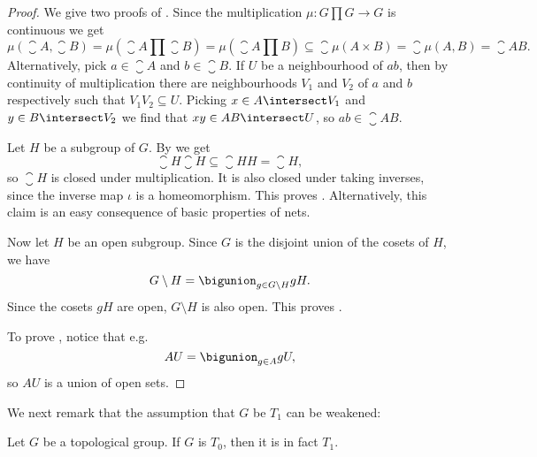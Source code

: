 \documentclass[article, a4paper, 11pt, oneside]{memoir}
\numberwithin{equation}{chapter}
\begin{document}
\begin{proof}
    We give two proofs of . Since the multiplication $\mu \colon G \prod G \to G$ is continuous we get
    \begin{equation*}
        \mu(\closure{A}, \closure{B})
            = \mu(\closure{A} \prod \closure{B})
            = \mu(\closure{A \prod B})
            \subseteq \closure{\mu(A \times B)}
            = \closure{\mu(A, B)}
            = \closure{AB}.
    \end{equation*}
    Alternatively, pick $a \in \closure{A}$ and $b \in \closure{B}$. If $U$ be a neighbourhood of $ab$, then by continuity of multiplication there are neighbourhoods $V_1$ and $V_2$ of $a$ and $b$ respectively such that $V_1 V_2 \subseteq U$. Picking $x \in A \intersect V_1$ and $y \in B \intersect V_2$ we find that $xy \in AB \intersect U$, so $ab \in \closure{AB}$.

    Let $H$ be a subgroup of $G$. By  we get
    \begin{equation*}
        \closure{H} \closure{H} \subseteq \closure{HH} = \closure{H},
    \end{equation*}
    so $\closure{H}$ is closed under multiplication. It is also closed under taking inverses, since the inverse map $\iota$ is a homeomorphism. This proves . Alternatively, this claim is an easy consequence of basic properties of nets.

    Now let $H$ be an open subgroup. Since $G$ is the disjoint union of the cosets of $H$, we have
    \begin{equation*}
        G \setminus H
            = \bigunion_{g \in G \setminus H} gH.
    \end{equation*}
    Since the cosets $gH$ are open, $G \setminus H$ is also open. This proves .

    To prove , notice that e.g.
    \begin{equation*}
        AU = \bigunion_{g \in A} gU,
    \end{equation*}
    so $AU$ is a union of open sets.
\end{proof}

We next remark that the assumption that $G$ be $T_1$ can be weakened:

\begin{proposition}
    Let $G$ be a topological group. If $G$ is $T_0$, then it is in fact $T_1$.
\end{proposition}
\end{document}
